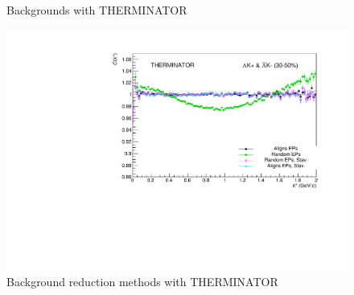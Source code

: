 \documentclass[../AnalysisNoteJBuxton.tex]{subfiles}
\begin{document}
\begin{figure}[h!]
  \caption[Backgrounds with THERMINATOR]{Backgrounds with THERMINATOR}
  \label{fig:BgdswTHERM}
\end{figure}


\begin{figure}[h]
  \centering
  \includegraphics[width=\textwidth]{5_Fitting/Figures/CompareBackgroundReductionMethods_Full_LamKchPwConj_3050_NumWeight1.pdf}
  \caption[Background reduction methods with THERMINATOR]{Background reduction methods with THERMINATOR}
  \label{fig:BgdRedMethodsTHERM}
\end{figure}
\end{document}
